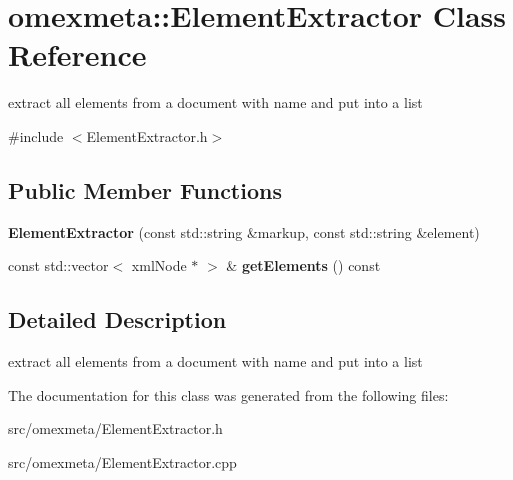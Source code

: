 \hypertarget{classomexmeta_1_1ElementExtractor}{}\section{omexmeta\+:\+:Element\+Extractor Class Reference}
\label{classomexmeta_1_1ElementExtractor}


extract all elements from a document with name and put into a list  




{\ttfamily \#include $<$Element\+Extractor.\+h$>$}

\subsection*{Public Member Functions}
\begin{DoxyCompactItemize}
\item 
\mbox{\label{classomexmeta_1_1ElementExtractor_a9de35d2d6cf78dad4fa9fb2f46fa8e37}} 
{\bfseries Element\+Extractor} (const std\+::string \&markup, const std\+::string \&element)
\item 
\mbox{\label{classomexmeta_1_1ElementExtractor_aedddcdb8149ac96e76f20ffd56980b0c}} 
const std\+::vector$<$ xml\+Node $\ast$ $>$ \& {\bfseries get\+Elements} () const
\end{DoxyCompactItemize}


\subsection{Detailed Description}
extract all elements from a document with name and put into a list 

The documentation for this class was generated from the following files\+:\begin{DoxyCompactItemize}
\item 
src/omexmeta/Element\+Extractor.\+h\item 
src/omexmeta/Element\+Extractor.\+cpp\end{DoxyCompactItemize}
